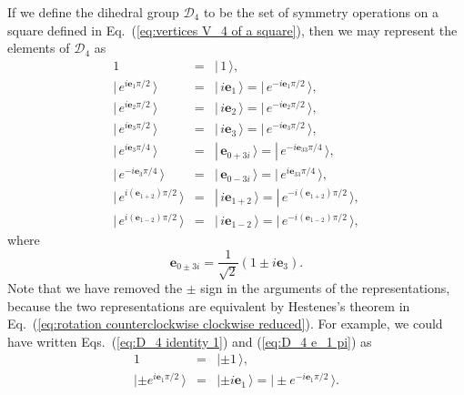 \documentclass[11pt,twocolumn]{article}
\begin{document}
If we define the dihedral group $\mathcal D_4$ to be the set of symmetry operations on a square defined in Eq.~(\ref{eq:vertices V_4 of a square}), then we may represent the elements of $\mathcal D_4$ as
\begin{eqnarray}
\label{eq:D_4 identity 1}
1&=&|\,1\,\rangle,\\
\label{eq:D_4 e_1 pi}
|\,e^{i\mathbf e_1\pi/2}\,\rangle&=&|\,i\mathbf e_1\,\rangle=|\,e^{-i\mathbf e_1\pi/2}\,\rangle,\\
\label{eq:D_4 e_2 pi}
|\,e^{i\mathbf e_2\pi/2}\,\rangle&=&|\,i\mathbf e_2\,\rangle=|\,e^{-i\mathbf e_2\pi/2}\,\rangle,\\
\label{eq:D_4 e_3 pi}
|\,e^{i\mathbf e_3\pi/2}\,\rangle&=&|\,i\mathbf e_3\,\rangle=|\,e^{-i\mathbf e_3\pi/2}\,\rangle,\\
\label{eq:D_4 e_3 pi half}
|\,e^{i\mathbf e_3\pi/4}\,\rangle&=&|\,\mathbf e_{0+3i}\,\rangle=|\,e^{-i\mathbf e_33\pi/4}\,\rangle,\\
\label{eq:D_4 e_3 -pi half}
|\,e^{-i\mathbf e_3\pi/4}\,\rangle&=&|\,\mathbf e_{0-3i}\,\rangle=|\,e^{i\mathbf e_33\pi/4}\,\rangle,\\
\label{eq:D_4 e_1 + e_2}
|\,e^{i(\mathbf e_{1+2})\pi/2}\,\rangle&=&|\,i\mathbf e_{1+2}\,\rangle=|\,e^{-i(\mathbf e_{1+2})\pi/2}\,\rangle,\\
\label{eq:D_4 e_1 - e_2}
|\,e^{i(\mathbf e_{1\!-2})\pi/2}\,\rangle&=&|\,i\mathbf e_{1\!-2}\,\rangle=|\,e^{-i(\mathbf e_{1\!-2})\pi/2}\,\rangle,
\end{eqnarray}
where
\begin{equation}
\label{eq:e_0 pm 3i}
\mathbf e_{0\pm 3i}=\frac{1}{\sqrt 2}(1\pm i\mathbf e_3).
\end{equation}
Note that we have removed the $\pm$ sign in the arguments of the representations, because the two representations are equivalent by Hestenes's theorem in Eq.~(\ref{eq:rotation counterclockwise clockwise reduced}).  For example, we could have written Eqs.~(\ref{eq:D_4 identity 1}) and (\ref{eq:D_4 e_1 pi}) as
\begin{eqnarray}
\label{eq:D_4 identity 1 pm}
1&=&|\pm 1\,\rangle,\\
\label{eq:D_4 e_1 pi pm}
|\pm e^{i\mathbf e_1\pi/2}\,\rangle&=&|\pm i\mathbf e_1\,\rangle=|\pm e^{-i\mathbf e_1\pi/2}\,\rangle.
\end{eqnarray}
\end{document}
